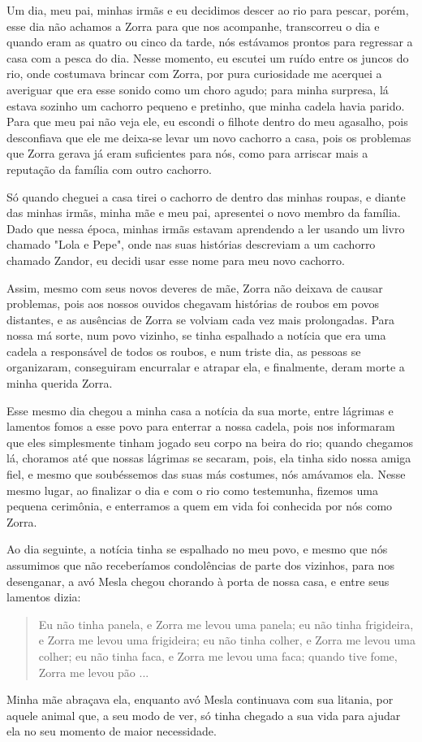 Um dia, meu pai, minhas irmãs e eu decidimos descer ao rio para pescar, porém, esse dia não achamos a Zorra para que nos acompanhe, transcorreu o dia e quando eram as quatro ou cinco da tarde, nós estávamos prontos para regressar a casa com a pesca do dia. Nesse momento, eu escutei um ruído entre os juncos do rio, onde costumava brincar com Zorra, por pura curiosidade me acerquei a averiguar que era esse sonido como um choro agudo; para minha surpresa, lá estava sozinho um cachorro pequeno e pretinho, que minha cadela havia parido.  
Para que meu pai não veja ele, eu escondi o filhote dentro do meu agasalho, pois desconfiava que ele me deixa-se levar um novo cachorro a casa, pois os problemas que Zorra gerava já eram suficientes para nós, como para arriscar mais a reputação da família com outro cachorro.


Só quando cheguei a casa tirei o cachorro de dentro das minhas roupas, e diante das minhas irmãs, minha mãe e meu pai, apresentei o novo membro da família. Dado que nessa época, minhas irmãs estavam aprendendo a ler usando um livro chamado "Lola e Pepe", onde nas suas histórias descreviam a um cachorro chamado Zandor, eu decidi usar esse nome para meu novo cachorro. 

Assim, mesmo com seus novos deveres de mãe, Zorra não deixava de causar problemas, pois aos nossos ouvidos chegavam histórias de roubos em povos distantes, e as ausências de Zorra se volviam cada vez mais prolongadas.
Para nossa má sorte, num povo vizinho, se tinha espalhado a notícia que era uma cadela a responsável de todos os roubos, e num triste dia, as pessoas se organizaram, conseguiram encurralar e atrapar ela, e finalmente, deram morte a minha querida Zorra.

Esse mesmo dia chegou a minha casa a notícia da sua morte, entre lágrimas e lamentos fomos a esse povo para enterrar a nossa cadela, pois nos informaram que eles simplesmente tinham jogado seu corpo na beira do rio; quando chegamos lá, choramos até que nossas lágrimas se secaram, pois, ela tinha sido nossa amiga fiel, e mesmo que soubéssemos das suas más costumes, nós amávamos ela.
Nesse mesmo lugar, ao finalizar o dia e com o rio como testemunha, fizemos uma pequena cerimônia, e enterramos a quem em vida foi conhecida por nós como Zorra.

Ao dia seguinte, a notícia tinha se espalhado no meu povo, e mesmo que nós assumimos que não receberíamos condolências de parte dos vizinhos, para nos desenganar, a avó Mesla chegou chorando à porta de nossa casa, e entre seus lamentos dizia:
\begin{quotation}
Eu não tinha panela, e Zorra me levou uma panela; 
eu não tinha frigideira, e Zorra me levou uma frigideira; 
eu não tinha colher, e Zorra me levou uma colher;
eu não tinha faca, e Zorra me levou uma faca;
quando tive fome, Zorra me levou pão ...  
\end{quotation}
Minha mãe abraçava ela, enquanto avó Mesla continuava com sua litania, por aquele animal que, a seu modo de ver, só tinha chegado a sua vida para ajudar ela no seu momento de maior necessidade.
 


